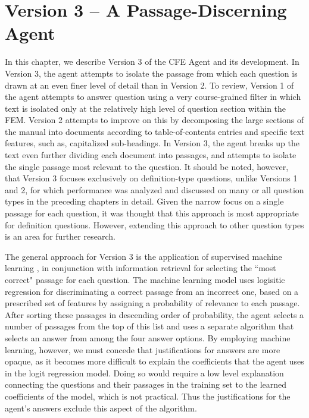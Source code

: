  
\chapter{Version 3 -- A Passage-Discerning Agent}

In this chapter, we describe Version 3 of the CFE Agent and its development.  In Version 3, the agent attempts to isolate the passage from which each question is drawn at an even finer level of detail than in Version 2.  To review, Version 1 of the agent attempts to answer question using a very course-grained filter in which text is isolated only at the relatively high level of question section within the FEM.  Version 2 attempts to improve on this by decomposing the large sections of the manual into documents according to table-of-contents entries and specific text features, such as, capitalized sub-headings.  In Version 3, the agent breaks up the text even further dividing each document into passages, and attempts to isolate the single passage most relevant to the question.  It should be noted, however, that Version 3 focuses exclusively on definition-type questions, unlike Versions 1 and 2, for which performance was analyzed and discussed on many or all question types in the preceding chapters in detail.  Given the narrow focus on a single passage for each question, it was thought that this approach is most appropriate for definition questions.  However, extending this approach to other question types is an area for further research.

The general approach for Version 3 is the application of supervised machine learning  \cite{alpaydin_2014_introduction_ch1}, in conjunction with information retrieval for selecting the ``most correct" passage for each question.  The machine learning model uses logisitic regression for discriminating a correct passage from an incorrect one, based on a prescribed set of features by assigning a probability of relevance to each passage.  After sorting these passages in descending order of probability, the agent selects a number of passages from the top of this list and uses a separate algorithm that selects an answer from among the four answer options.  By employing machine learning, however, we must concede that justifications for answers are more opaque, as it becomes more difficult to explain the coefficients that the agent uses in the logit regression model.  Doing so would require a low level explanation connecting the questions and their passages in the training set to the learned coefficients of the model, which is not practical.  Thus the justifications for the agent's answers exclude this aspect of the algorithm.

